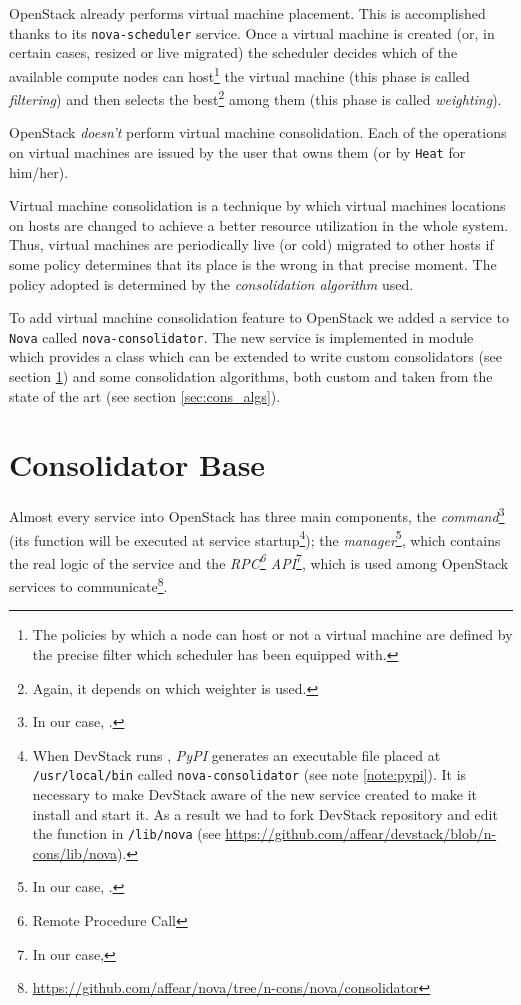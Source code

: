 OpenStack already performs virtual machine placement. This is accomplished thanks to its \texttt{nova-scheduler} service. Once a virtual machine is created (or, in certain cases, resized or live migrated) the scheduler decides which of the available compute nodes can host\footnote{The policies by which a node can host or not a virtual machine are defined by the precise filter which scheduler has been equipped with.} the virtual machine (this phase is called \textit{filtering}) and then selects the best\footnote{Again, it depends on which weighter is used.} among them (this phase is called \textit{weighting}).

OpenStack \emph{doesn't} perform virtual machine consolidation. Each of the operations on virtual machines are issued by the user that owns them (or by \texttt{Heat} for him/her).

Virtual machine consolidation is a technique by which virtual machines locations on hosts are changed to achieve a better resource utilization in the whole system. Thus, virtual machines are periodically live (or cold) migrated to other hosts if some policy determines that its place is the wrong in that precise moment. The policy adopted is determined by the \emph{consolidation algorithm} used.

To add virtual machine consolidation feature to OpenStack we added a service to \texttt{Nova} called \texttt{nova-consolidator}. The new service is implemented in module  which provides a  class which can be extended to write custom consolidators (see section \ref{sec:cons_base}) and some consolidation algorithms, both custom and taken from the state of the art (see section \ref{sec:cons_algs}).

\section{Consolidator Base}
\label{sec:cons_base}

Almost every service into OpenStack has three main components, the \emph{command}\footnote{In our case, .} (its function  will be executed at service startup\footnote{When DevStack runs , \textit{PyPI} generates an executable file placed at \texttt{/usr/local/bin} called \texttt{nova-consolidator} (see note \ref{note:pypi}). It is necessary to make DevStack aware of the new service created to make it install and start it. As a result we had to fork DevStack repository and edit the function  in \texttt{/lib/nova} (see \url{https://github.com/affear/devstack/blob/n-cons/lib/nova}).}); the \emph{manager}\footnote{In our case, .}, which contains the real logic of the service and the \emph{RPC\footnote{Remote Procedure Call} API}\footnote{In our case, }, which is used among OpenStack services to communicate\footnote{\url{https://github.com/affear/nova/tree/n-cons/nova/consolidator}}.

